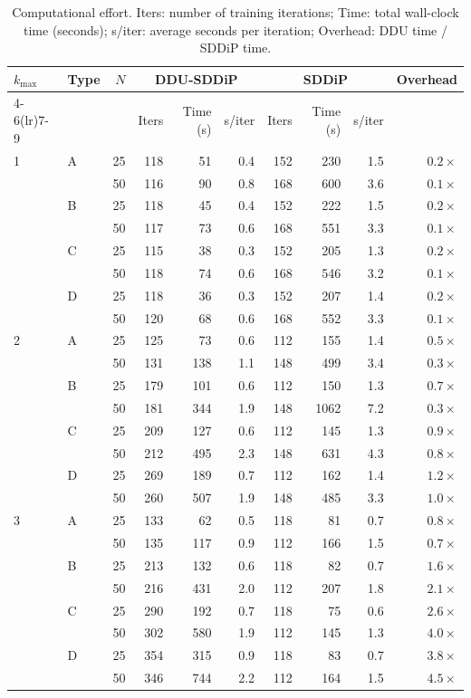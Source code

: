 \begin{table}[ht]
\centering
\caption{Computational effort. Iters: number of training iterations; Time: total wall-clock time (seconds); s/iter: average seconds per iteration; Overhead: DDU time / SDDiP time.}
\label{tab:computation}
\small
\begin{tabular}{llr rrr rrr r}
\toprule
$k_{\max}$ & Type & $N$ & \multicolumn{3}{c}{DDU-SDDiP} & \multicolumn{3}{c}{SDDiP} & Overhead \\
\cmidrule(lr){4-6}\cmidrule(lr){7-9}
& & & Iters & Time (s) & s/iter & Iters & Time (s) & s/iter & \\
\midrule
1 & A & 25 & 118 & 51 & 0.4 & 152 & 230 & 1.5 & $0.2\times$ \\
 &  & 50 & 116 & 90 & 0.8 & 168 & 600 & 3.6 & $0.1\times$ \\
 & B & 25 & 118 & 45 & 0.4 & 152 & 222 & 1.5 & $0.2\times$ \\
 &  & 50 & 117 & 73 & 0.6 & 168 & 551 & 3.3 & $0.1\times$ \\
 & C & 25 & 115 & 38 & 0.3 & 152 & 205 & 1.3 & $0.2\times$ \\
 &  & 50 & 118 & 74 & 0.6 & 168 & 546 & 3.2 & $0.1\times$ \\
 & D & 25 & 118 & 36 & 0.3 & 152 & 207 & 1.4 & $0.2\times$ \\
 &  & 50 & 120 & 68 & 0.6 & 168 & 552 & 3.3 & $0.1\times$ \\
\midrule
2 & A & 25 & 125 & 73 & 0.6 & 112 & 155 & 1.4 & $0.5\times$ \\
 &  & 50 & 131 & 138 & 1.1 & 148 & 499 & 3.4 & $0.3\times$ \\
 & B & 25 & 179 & 101 & 0.6 & 112 & 150 & 1.3 & $0.7\times$ \\
 &  & 50 & 181 & 344 & 1.9 & 148 & 1062 & 7.2 & $0.3\times$ \\
 & C & 25 & 209 & 127 & 0.6 & 112 & 145 & 1.3 & $0.9\times$ \\
 &  & 50 & 212 & 495 & 2.3 & 148 & 631 & 4.3 & $0.8\times$ \\
 & D & 25 & 269 & 189 & 0.7 & 112 & 162 & 1.4 & $1.2\times$ \\
 &  & 50 & 260 & 507 & 1.9 & 148 & 485 & 3.3 & $1.0\times$ \\
\midrule
3 & A & 25 & 133 & 62 & 0.5 & 118 & 81 & 0.7 & $0.8\times$ \\
 &  & 50 & 135 & 117 & 0.9 & 112 & 166 & 1.5 & $0.7\times$ \\
 & B & 25 & 213 & 132 & 0.6 & 118 & 82 & 0.7 & $1.6\times$ \\
 &  & 50 & 216 & 431 & 2.0 & 112 & 207 & 1.8 & $2.1\times$ \\
 & C & 25 & 290 & 192 & 0.7 & 118 & 75 & 0.6 & $2.6\times$ \\
 &  & 50 & 302 & 580 & 1.9 & 112 & 145 & 1.3 & $4.0\times$ \\
 & D & 25 & 354 & 315 & 0.9 & 118 & 83 & 0.7 & $3.8\times$ \\
 &  & 50 & 346 & 744 & 2.2 & 112 & 164 & 1.5 & $4.5\times$ \\
\bottomrule
\end{tabular}
\end{table}